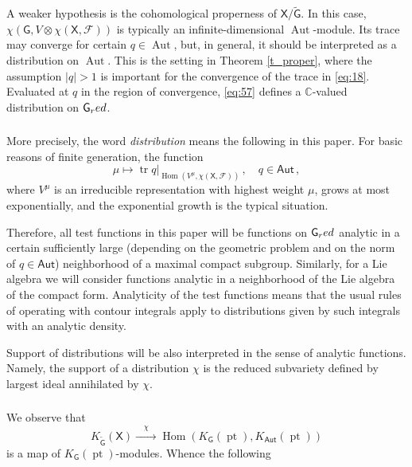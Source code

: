 \documentclass[14pt]{extarticle}
\newcommand{\C}{\mathbb{C}}
\newcommand{\bG}{\mathsf{G}}
\newcommand{\bGt}{{\widetilde{\mathsf{G}}}}
\newcommand{\bX}{\mathsf{X}}
\newcommand{\cF}{\mathscr{F}}
\newcommand{\red}{\textup{red}}
\newcommand{\bAut}{\mathsf{Aut}}
\DeclareMathOperator{\Hom}{Hom}
\DeclareMathOperator{\Aut}{Aut}
\DeclareMathOperator{\pt}{pt}
\DeclareMathOperator{\tr}{tr}
\theoremstyle{definition}
\begin{document}
A weaker hypothesis is the cohomological properness of $\bX/\bGt$.
In this case, $\chi(\bG, V\otimes \chi(\bX,\cF))$
is typically an infinite-dimensional $\Aut$-module. Its trace may converge
for certain $q\in \Aut$, but, in general, it should be interpreted as a
distribution on $\Aut$. This is the setting in Theorem \ref{t_proper}, where
the assumption $|q|>1$ is important for the convergence of the trace
in \eqref{eq:18}. Evaluated at $q$ in the region of convergence,
\eqref{eq:57} defines a $\C$-valued distribution on $\bG_\red$. 

\subsubsection{}\label{s_distr}
More precisely, the word 
\emph{distribution} 
means the following in this paper. 
For basic reasons of finite generation, the function
\[
  \mu \mapsto \tr q \Big|_{\Hom(V^\mu,
  \chi(\bX,\cF))}\,, \quad q\in \bAut\,, 
\]
where $V^\mu$ is an irreducible representation with highest weight
$\mu$, grows at most exponentially, and the exponential growth
is the typical situation.

Therefore, all test functions in this paper will be functions on
$\bG_\red$ analytic in a certain sufficiently large (depending on the
geometric problem and on the norm of 
$q\in \bAut$) neighborhood of a maximal compact subgroup.
Similarly, for a Lie algebra we will consider functions analytic in
a neighborhood of the Lie algebra of the compact form. Analyticity
of the test functions means that the usual rules of operating
with contour integrals apply to distributions given by such integrals
with an analytic density.

Support of distributions will be also interpreted in the sense of
analytic functions. Namely, the support of a distribution $\chi$ is the
reduced subvariety defined by largest ideal annihilated by $\chi$. 





\subsubsection{}
We observe that
%
\begin{equation}
  K_\bGt(\bX)
  \xrightarrow{\quad \chi \quad} \Hom(K_\bG(\pt),K_{\bAut}(\pt)) \label{eq:38}
\end{equation}
%
is a map of $K_\bG(\pt)$-modules. Whence the following 
\end{document}
